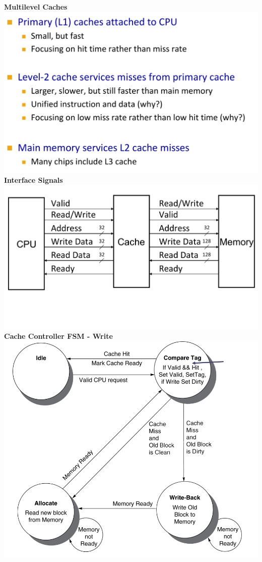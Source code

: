 \textbf{Multilevel Caches}\\
\includegraphics[width=\linewidth]{png/multi.png}
\textbf{Interface Signals}\\
\includegraphics[width=\linewidth]{png/diagram.png}
\textbf{Cache Controller FSM - Write}\\
\includegraphics[width=\linewidth]{png/fsm.png}
